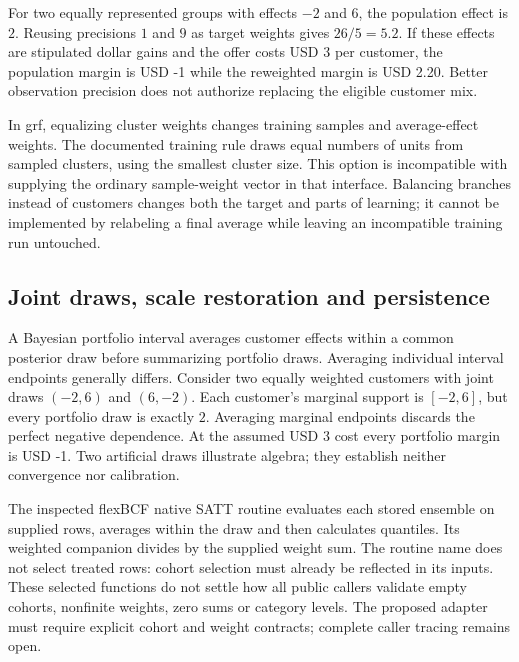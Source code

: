 For two equally represented groups with effects $-2$ and $6$, the population effect is $2$. Reusing precisions $1$ and $9$ as target weights gives $26/5=5.2$. If these effects are stipulated dollar gains and the offer costs USD 3 per customer, the population margin is USD -1 while the reweighted margin is USD 2.20. Better observation precision does not authorize replacing the eligible customer mix.~\citep{exec21_cxx_reference}

In grf, equalizing cluster weights changes training samples and average-effect weights. The documented training rule draws equal numbers of units from sampled clusters, using the smallest cluster size. This option is incompatible with supplying the ordinary sample-weight vector in that interface. Balancing branches instead of customers changes both the target and parts of learning; it cannot be implemented by relabeling a final average while leaving an incompatible training run untouched.~\citep{exec21_cxx_grf}

\subsection{Joint draws, scale restoration and persistence}
\label{exec21:cxx-draws}
A Bayesian portfolio interval averages customer effects within a common posterior draw before summarizing portfolio draws. Averaging individual interval endpoints generally differs. Consider two equally weighted customers with joint draws $(-2,6)$ and $(6,-2)$. Each customer's marginal support is $[-2,6]$, but every portfolio draw is exactly $2$. Averaging marginal endpoints discards the perfect negative dependence. At the assumed USD 3 cost every portfolio margin is USD -1. Two artificial draws illustrate algebra; they establish neither convergence nor calibration.~\citep{exec21_cxx_reference}

The inspected flexBCF native SATT routine evaluates each stored ensemble on supplied rows, averages within the draw and then calculates quantiles. Its weighted companion divides by the supplied weight sum. The routine name does not select treated rows: cohort selection must already be reflected in its inputs. These selected functions do not settle how all public callers validate empty cohorts, nonfinite weights, zero sums or category levels. The proposed adapter must require explicit cohort and weight contracts; complete caller tracing remains open.~\citep{exec21_cxx_flexbcf}


